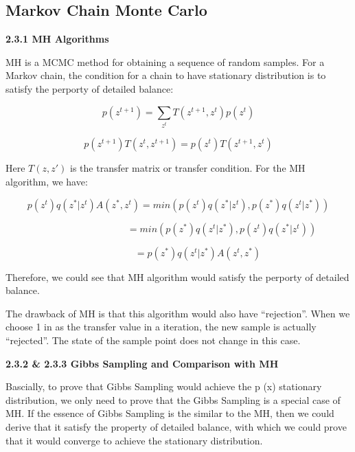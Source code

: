 \documentclass{article} %
\begin{document}
\subsection{Markov Chain Monte Carlo}

\textbf{2.3.1 MH Algorithms}

MH is a MCMC method for obtaining a sequence of random samples. For a Markov
chain, the condition for a chain to have stationary distribution is to satisfy
the perporty of detailed balance:

\begin{equation}
p (z^{t+1}) = \sum_{z^t} T(z^{t+1}, z^t) p (z^t)
\end{equation}

\begin{equation}
p (z^{t+1}) T (z^t, z^{t+1}) = p (z^t) T (z^{t+1}, z^t)
\end{equation}

Here $T (z, z')$ is the transfer matrix or transfer condition. For the MH
algorithm, we have:

\begin{equation}
p (z^t) q (z^* | z^t) A (z^*, z^t) =
min ( p (z^t) q (z^* | z^t), p (z^*) q (z^t | z^*) )
\end{equation}

\begin{equation}
\qquad \qquad \qquad \qquad \quad =
min ( p (z^*) q (z^t | z^*), p (z^t) q (z^* | z^t) )
\end{equation}

\begin{equation}
\qquad \qquad =
p (z^*) q (z^t | z^*) A (z^t, z^*)
\end{equation}

Therefore, we could see that MH algorithm would satisfy the perporty of detailed
balance.

The drawback of MH is that this algorithm would also have
``rejection''. When we choose 1 in as the transfer value in a iteration, the new
sample is actually ``rejected''. The state of the sample point does not change
in this case.

\textbf{2.3.2 \& 2.3.3 Gibbs Sampling and Comparison with MH}

Bascially, to prove that Gibbs Sampling would achieve the p (x) stationary
distribution, we only need to prove that the Gibbs Sampling is a special case of
MH. If the essence of Gibbs Sampling is the similar to the MH, then we could
derive that it satisfy the property of detailed balance, with which we could
prove that it would converge to achieve the stationary distribution.
\end{document}
